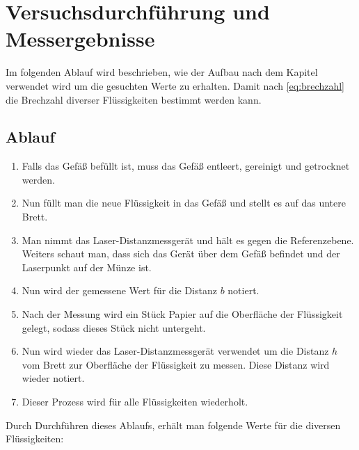 \documentclass[11pt,ngerman]{scrartcl}
\begin{document}
\section{Versuchsdurchführung und Messergebnisse}
\label{sec:versuchsdurchfuehrung_messergebnisse}
Im folgenden Ablauf wird beschrieben, wie der Aufbau nach 
dem Kapitel  verwendet wird
um die gesuchten Werte zu erhalten. Damit nach \autoref{eq:brechzahl}
die Brechzahl diverser Flüssigkeiten bestimmt werden kann.

\subsection{Ablauf}
\begin{enumerate} \label{en:Ablauf}
    \item Falls das Gefäß befüllt ist, muss das Gefäß entleert, gereinigt und getrocknet werden.
    \item Nun füllt man die neue Flüssigkeit in das Gefäß und stellt es auf das untere Brett.
    \item Man nimmt das Laser-Distanzmessgerät und hält es gegen die Referenzebene. Weiters schaut
        man, dass sich das Gerät über dem Gefäß befindet und der Laserpunkt auf der Münze ist.
    \item Nun wird der gemessene Wert für die Distanz $b$ notiert.
    \item Nach der Messung wird ein Stück Papier auf die Oberfläche der Flüssigkeit gelegt, sodass
        dieses Stück nicht untergeht.
    \item Nun wird wieder das Laser-Distanzmessgerät verwendet um die Distanz $h$ vom Brett
        zur Oberfläche der Flüssigkeit zu messen. Diese Distanz wird wieder notiert.
    \item Dieser Prozess wird für alle Flüssigkeiten wiederholt.
\end{enumerate}

Durch Durchführen dieses Ablaufs, erhält man folgende Werte für die diversen Flüssigkeiten:
\end{document}
